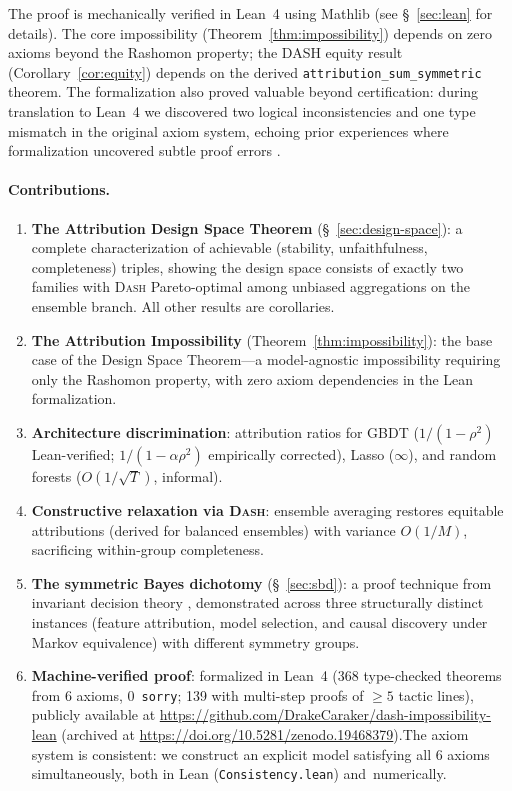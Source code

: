 \documentclass{jmlr}
\newcommand{\DASH}{\textsc{Dash}}
\newcommand{\GBDT}{\textsc{GBDT}}
\begin{document}
The proof is mechanically verified in Lean~4 using Mathlib (see \S~\ref{sec:lean} for details).
The core impossibility (Theorem~\ref{thm:impossibility}) depends on zero axioms beyond the Rashomon property; the DASH equity result (Corollary~\ref{cor:equity}) depends on the derived \texttt{attribution\_sum\_symmetric} theorem.
The formalization also proved valuable beyond certification: during translation to Lean~4 we discovered two logical inconsistencies and one type mismatch in the original axiom system, echoing prior experiences where formalization uncovered subtle proof errors \citep{nipkow2009social,zhang2026statistical}.

\paragraph{Contributions.}
\begin{enumerate}
    \item \textbf{The Attribution Design Space Theorem} (\S~\ref{sec:design-space}): a complete characterization of achievable (stability, unfaithfulness, completeness) triples, showing the design space consists of exactly two families with \DASH{} Pareto-optimal among unbiased aggregations on the ensemble branch. All other results are corollaries.
    \item \textbf{The Attribution Impossibility} (Theorem~\ref{thm:impossibility}): the base case of the Design Space Theorem---a model-agnostic impossibility requiring only the Rashomon property, with zero axiom dependencies in the Lean formalization.
    \item \textbf{Architecture discrimination}: attribution ratios for \GBDT{} ($1/(1{-}\rho^2)$ Lean-verified; $1/(1{-}\alpha\rho^2)$ empirically corrected), Lasso ($\infty$), and random forests ($O(1/\sqrt{T})$, informal).
    \item \textbf{Constructive relaxation via \DASH{}}: ensemble averaging restores equitable attributions (derived for balanced ensembles) with variance $O(1/M)$, sacrificing within-group completeness.
    \item \textbf{The symmetric Bayes dichotomy} (\S~\ref{sec:sbd}): a proof technique from invariant decision theory \citep{lehmann2005testing}, demonstrated across three structurally distinct instances (feature attribution, model selection, and causal discovery under Markov equivalence) with different symmetry groups.
    \item \textbf{Machine-verified proof}: formalized in Lean~4 (368 type-checked theorems from 6 axioms, 0~\texttt{sorry}; 139 with multi-step proofs of ${\geq}5$ tactic lines), publicly available at \url{https://github.com/DrakeCaraker/dash-impossibility-lean} (archived at \url{https://doi.org/10.5281/zenodo.19468379}).\linebreak The axiom system is consistent: we construct an explicit model satisfying all 6 axioms simultaneously, both in Lean (\texttt{Consistency.lean}) and~numerically.
\end{enumerate}
\end{document}
